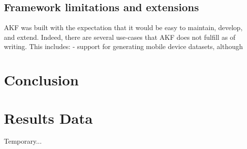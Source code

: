 \documentclass[letterpaper,12pt]{report}
\begin{document}
\section{Framework limitations and
extensions}\label{framework-limitations-and-extensions}

AKF was built with the expectation that it would be easy to maintain,
develop, and extend. Indeed, there are several use-cases that AKF does
not fulfill as of writing. This includes: - support for generating
mobile device datasets, although

\chapter{Conclusion}\label{chapter-nine}





\printglossary[type=\acronymtype]
\printglossary

\nocite{*}


\appendix

\chapter{Results Data} \label{appendix-B}
Temporary...
\end{document}
